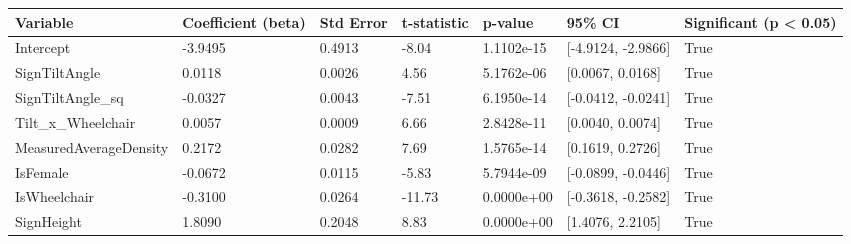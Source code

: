 \begin{tabular}{lllllll}
\hline
Variable & Coefficient (beta) & Std Error & t-statistic & p-value & 95\% CI & Significant (p < 0.05) \\ \hline
Intercept & -3.9495 & 0.4913 & -8.04 & 1.1102e-15 & [-4.9124, -2.9866] & True \\
SignTiltAngle & 0.0118 & 0.0026 & 4.56 & 5.1762e-06 & [0.0067, 0.0168] & True \\
SignTiltAngle\_sq & -0.0327 & 0.0043 & -7.51 & 6.1950e-14 & [-0.0412, -0.0241] & True \\
Tilt\_x\_Wheelchair & 0.0057 & 0.0009 & 6.66 & 2.8428e-11 & [0.0040, 0.0074] & True \\
MeasuredAverageDensity & 0.2172 & 0.0282 & 7.69 & 1.5765e-14 & [0.1619, 0.2726] & True \\
IsFemale & -0.0672 & 0.0115 & -5.83 & 5.7944e-09 & [-0.0899, -0.0446] & True \\
IsWheelchair & -0.3100 & 0.0264 & -11.73 & 0.0000e+00 & [-0.3618, -0.2582] & True \\
SignHeight & 1.8090 & 0.2048 & 8.83 & 0.0000e+00 & [1.4076, 2.2105] & True \\
\hline
\end{tabular}
